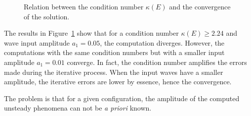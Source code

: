 \begin{figure}[htp]
  \centering
  \caption{Relation between the condition number $\kappa (E)$ and the convergence of the solution.}
  \label{fig:canal_residual_vs_conditionning}
\end{figure}
The results in Figure~\ref{fig:canal_residual_vs_conditionning} show that
for a condition number $\kappa (E) \geq 2.24$ and wave input amplitude
$a_1 = 0.05$, the computation diverges. However, the computations with
the same condition numbers but with a smaller input amplitude $a_1 = 0.01$
converge. In fact, the condition number amplifies the errors made
during the iterative process. When the input waves have a smaller
amplitude, the iterative errors are lower by essence, hence the
convergence.

The problem is that for a given configuration, the 
amplitude of the computed unsteady phenomena can not
be \emph{a priori} known. 

